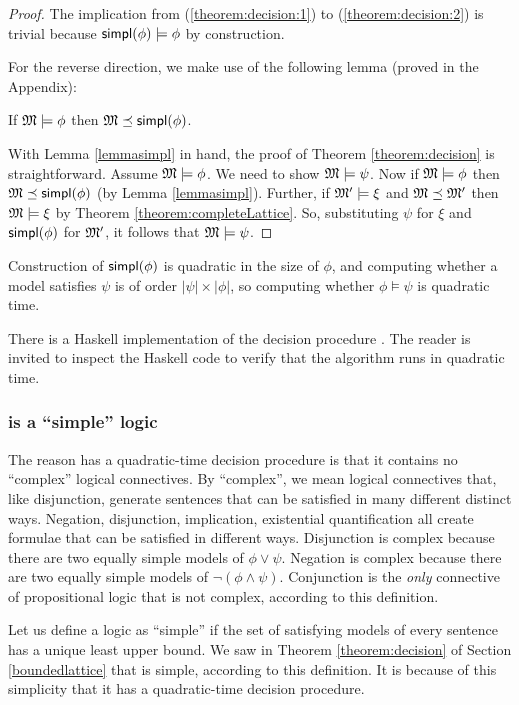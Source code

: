 \begin{proof}
The implication from  (\ref{theorem:decision:1}) to
(\ref{theorem:decision:2}) is trivial because $\mathsf{simpl}(\phi) \models \phi$ by construction.

For the reverse direction, we make use of the following lemma (proved in the Appendix):
\begin{lemma}
\label{lemmasimpl}
If $\frak{M} \models \phi$ then $\frak{M} \preceq \mathsf{simpl}(\phi)$.
\end{lemma}

With Lemma \ref{lemmasimpl} in hand, the proof of Theorem \ref{theorem:decision} is straightforward.
Assume $\frak{M} \models \phi$. We need to show
$\frak{M} \models \psi$.  Now if $\frak{M} \models \phi$ then $\frak{M} \preceq
\mathsf{simpl}(\phi)$ (by Lemma \ref{lemmasimpl}).  Further, if $\frak{M}' \models \xi $
and $\frak{M} \preceq \frak{M}'$ then $\frak{M} \models \xi $ by Theorem
\ref{theorem:completeLattice}. So, substituting $\psi$ for $\xi $ and
$\mathsf{simpl}(\phi)$ for $\frak{M}'$, it follows that $\frak{M} \models \psi$.
\end{proof}

\NI Construction of $\mathsf{simpl}(\phi)$ is quadratic in the size of $\phi$,
and computing whether a model satisfies $\psi$ is of order $|\psi|
\times |\phi|$, so computing whether $\phi \models \psi$ is quadratic
time.

There is a Haskell implementation of the decision procedure
\cite{HaskellImplementation}.  The reader is invited to inspect the Haskell code to verify that the algorithm runs in quadratic time.

\subsubsection{\Cathoristic{} is a ``simple'' logic}
The reason \cathoristic{} has a quadratic-time decision procedure is that it contains no
``complex'' logical connectives.  
By ``complex'', we mean logical
connectives that, like disjunction, generate sentences that can be
satisfied in many different distinct ways.  
Negation, disjunction,
implication, existential quantification all create formulae that can
be satisfied in different ways.  
 Disjunction
is complex because there are two equally simple models of
$\phi \lor \psi$.  
Negation is complex because
there are two equally simple models of $\neg (\phi \land \psi)$.
Conjunction is the \emph{only} connective of propositional logic that
is not complex, according to this definition.

Let us define a logic as ``simple'' if the set of satisfying
models of every sentence has a unique least upper bound. 
We saw in Theorem \ref{theorem:decision} of Section \ref{boundedlattice} that \cathoristic{} is simple, according to this definition.
It is because of this simplicity that it has a quadratic-time decision procedure.

